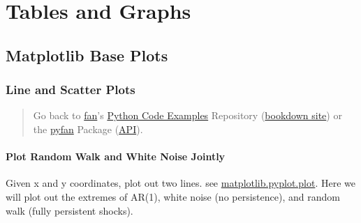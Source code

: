 \documentclass[
]{book}
\begin{document}
\hypertarget{tables-and-graphs}{%
\chapter{Tables and Graphs}\label{tables-and-graphs}}

\hypertarget{matplotlib-base-plots}{%
\section{Matplotlib Base Plots}\label{matplotlib-base-plots}}

\hypertarget{line-and-scatter-plots}{%
\subsection{Line and Scatter Plots}\label{line-and-scatter-plots}}

\begin{quote}
Go back to \href{http://fanwangecon.github.io/}{fan}'s \href{https://fanwangecon.github.io/Py4Econ/}{Python Code Examples} Repository (\href{https://fanwangecon.github.io/Py4Econ/bookdown}{bookdown site}) or the \href{https://pyfan.readthedocs.io/en/latest/}{pyfan} Package (\href{https://pyfan.readthedocs.io/en/latest/reference.html}{API}).
\end{quote}

\hypertarget{plot-random-walk-and-white-noise-jointly}{%
\subsubsection{Plot Random Walk and White Noise Jointly}\label{plot-random-walk-and-white-noise-jointly}}

Given x and y coordinates, plot out two lines. see \href{https://matplotlib.org/2.1.1/api/_as_gen/matplotlib.pyplot.plot.html}{matplotlib.pyplot.plot}. Here we will plot out the extremes of AR(1), white noise (no persistence), and random walk (fully persistent shocks).
\end{document}

